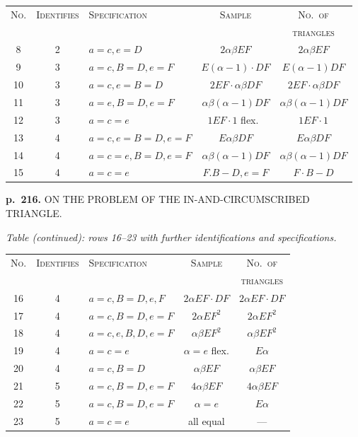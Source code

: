 \documentclass[11pt,a4paper]{article}
\begin{document}
\begin{center}
\begin{tabular}{cclcc}
\toprule
\textsc{No.} & \textsc{Identifies} & \textsc{Specification} & \textsc{Sample} & \textsc{No.\ of} \\
& & & & \textsc{triangles} \\
\midrule
8 & 2 & $a = c, e = D$ & $2 \alpha \beta EF$ & $2\alpha\beta EF$ \\
9 & 3 & $a = c, B = D, e = F$ & $E(\alpha-1)\cdot DF$ & $E(\alpha-1) DF$ \\
10 & 3 & $a = c, e = B = D$ & $2EF \cdot \alpha\beta DF$ & $2EF \cdot \alpha\beta DF$ \\
11 & 3 & $a = e, B = D, e = F$ & $\alpha\beta(\alpha-1) DF$ & $\alpha\beta(\alpha-1) DF$ \\
12 & 3 & $a = c = e$ & $1EF \cdot 1$ flex.\ & $1EF \cdot 1$ \\
13 & 4 & $a = c, e = B = D, e = F$ & $E\alpha\beta DF$ & $E\alpha\beta DF$ \\
14 & 4 & $a = c = e, B = D, e = F$ & $\alpha\beta(\alpha-1) D F$ & $\alpha\beta(\alpha-1) DF$ \\
15 & 4 & $a = c = e$ & $F.B-D, e=F$ & $F\cdot B-D$ \\
\bottomrule
\end{tabular}
\end{center}

\clearpage

\noindent
\textbf{p.~216.}  ON THE PROBLEM OF THE IN-AND-CIRCUMSCRIBED TRIANGLE.

\textit{Table (continued): rows 16--23 with further identifications and specifications.}

\begin{center}
\begin{tabular}{cclcc}
\toprule
\textsc{No.} & \textsc{Identifies} & \textsc{Specification} & \textsc{Sample} & \textsc{No.\ of} \\
& & & & \textsc{triangles} \\
\midrule
16 & 4 & $a = c, B = D, e, F$ & $2\alpha EF \cdot DF$ & $2\alpha EF \cdot DF$ \\
17 & 4 & $a = c, B = D, e = F$ & $2\alpha EF^2$ & $2\alpha EF^2$ \\
18 & 4 & $a = c, e, B, D, e = F$ & $\alpha \beta E F^2$ & $\alpha \beta E F^2$ \\
19 & 4 & $a = c = e$ & $\alpha = e$ flex. & $E \alpha$ \\
20 & 4 & $a = c, B = D$ & $\alpha\beta EF$ & $\alpha\beta EF$ \\
21 & 5 & $a = c, B = D, e = F$ & $4\alpha\beta EF$ & $4\alpha\beta EF$ \\
22 & 5 & $a = c, B = D, e = F$ & $\alpha = e$ & $E \alpha$ \\
23 & 5 & $a = c = e$ & all equal & --- \\
\bottomrule
\end{tabular}
\end{center}
\end{document}
